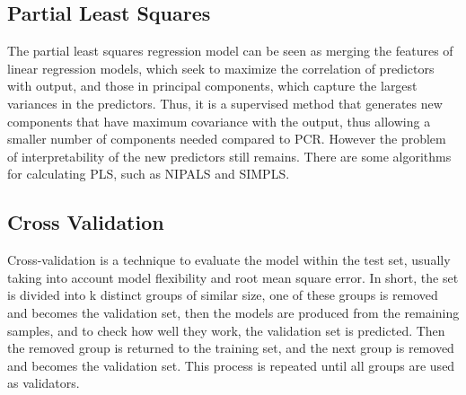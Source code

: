 \subsection{Partial Least Squares}
The partial least squares regression model can be seen as merging the features of linear regression models, which seek to maximize the correlation of predictors with output, and those in principal components, which capture the largest variances in the predictors. Thus, it is a supervised method that generates new components that have maximum covariance with the output, thus allowing a smaller number of components needed compared to PCR. However the problem of interpretability of the new predictors still remains. There are some algorithms for calculating PLS, such as NIPALS and SIMPLS.

\subsection{Cross Validation}

Cross-validation is a technique to evaluate the model within the test set, usually taking into account model flexibility and root mean square error. In short, the set is divided into k distinct groups of similar size, one of these groups is removed and becomes the validation set, then the models are produced from the remaining samples, and to check how well they work, the validation set is predicted. Then the removed group is returned to the training set, and the next group is removed and becomes the validation set. This process is repeated until all groups are used as validators.


